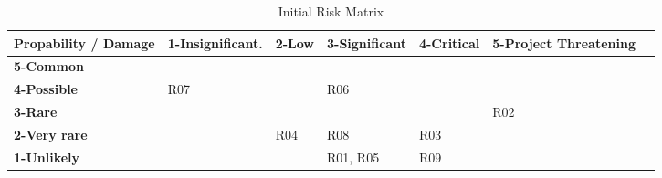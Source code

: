 \begin{table}[H]
  \centering
  \scriptsize
  \caption{Initial Risk Matrix}
  \begin{tabular}{|m{27mm}|m{24mm}|m{20mm}|m{20mm}|m{20mm}|m{20mm}|@{}m{0pt}@{}}
    \hline 	\bf Propability / Damage & \bf 1-Insignificant. 	& \bf 2-Low 				& \bf 3-Significant 			& \bf 4-Critical 			& \bf 5-Project Threatening 	& \\ [10pt]
    \hline 	\bf 5-Common 			& \cellcolor{yellow!50} 	& \cellcolor{orange!50} 	& \cellcolor{red!50} 			& \cellcolor{red!50} 		& \cellcolor{red!50} 			& \\ [10pt]
			\bf 4-Possible 			& \cellcolor{green!50} R07 	& \cellcolor{yellow!50} 	& \cellcolor{orange!50} R06 	& \cellcolor{red!50} 		& \cellcolor{red!50} 			& \\ [10pt]
			\bf 3-Rare 				& \cellcolor{green!50} 		& \cellcolor{green!50} 		& \cellcolor{yellow!50} 		& \cellcolor{orange!50} 	& \cellcolor{red!50} R02 		& \\ [10pt]
			\bf 2-Very rare 			& \cellcolor{green!50} 	& \cellcolor{green!50} R04 	& \cellcolor{green!50} R08 		& \cellcolor{yellow!50} R03 & \cellcolor{orange!50} 		& \\ [10pt]
			\bf 1-Unlikely 			& \cellcolor{green!50} 		& \cellcolor{green!50} 		& \cellcolor{green!50} R01, R05 & \cellcolor{green!50} R09 	& \cellcolor{yellow!50} 		& \\ [10pt]
    \hline
  \end{tabular} \\
\end{table}


